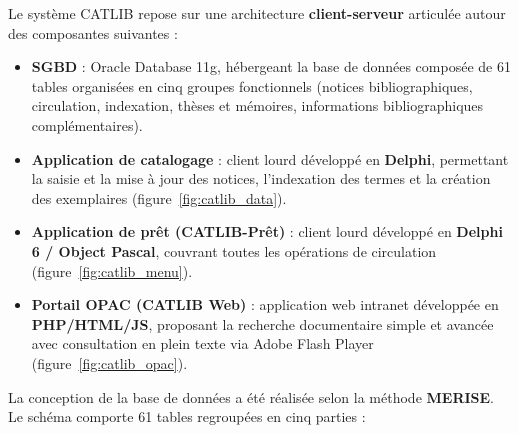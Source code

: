 Le système CATLIB repose sur une architecture \textbf{client-serveur} articulée
autour des composantes suivantes
:

\begin{itemize}
    \item \textbf{SGBD} : Oracle Database 11g, hébergeant la base de données composée de 61 tables organisées en cinq groupes
    fonctionnels (notices bibliographiques, circulation, indexation, thèses
    et mémoires, informations bibliographiques complémentaires).

    \item \textbf{Application de catalogage} : client lourd développé en
    \textbf{Delphi}, permettant la saisie et la mise à jour des notices,
    l'indexation des termes et la création des exemplaires
    (figure~\ref{fig:catlib_data}).

    \item \textbf{Application de prêt (CATLIB-Prêt)} : client lourd développé
    en \textbf{Delphi 6 / Object Pascal}, couvrant toutes les opérations de
    circulation (figure~\ref{fig:catlib_menu}).

    \item \textbf{Portail OPAC (CATLIB Web)} : application web intranet
    développée en \textbf{PHP/HTML/JS}, proposant la recherche documentaire
    simple et avancée avec consultation en plein texte via Adobe Flash Player
    (figure~\ref{fig:catlib_opac}).
\end{itemize}

La conception de la base de données a été réalisée selon la méthode
\textbf{MERISE}. Le schéma comporte 61 tables regroupées en cinq parties :


